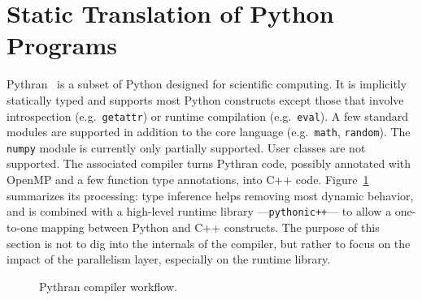 \documentclass[conference]{IEEEtran}
\begin{document}
\section{Static Translation of Python Programs}\label{sec:python-static}

Pythran~\cite{pythran2013} is a subset of Python designed for scientific
computing. It is implicitly statically typed and supports most Python constructs
except those that involve introspection (e.g.\ \texttt{getattr}) or runtime
compilation (e.g.\ \texttt{eval}). A few standard modules are supported in
addition to the core language (e.g.\ \texttt{math}, \texttt{random}). The
\texttt{numpy} module is currently only partially supported. User classes are
not supported. The associated compiler turns Pythran code, possibly annotated
with OpenMP and a few function type annotations, into C++ code.
Figure~\ref{fig:pythran-compiler} summarizes its processing: type inference
helps removing most dynamic behavior, and is combined with a high-level runtime
library ---\texttt{pythonic++}--- to allow a one-to-one mapping between Python
and C++ constructs. The purpose of this section is not to dig into the internals
of the compiler, but rather to focus on the impact of the parallelism layer,
especially on the runtime library.

\begin{figure}

\centering
{}

\caption{Pythran compiler workflow.}
\label{fig:pythran-compiler}
\end{figure}
\end{document}
